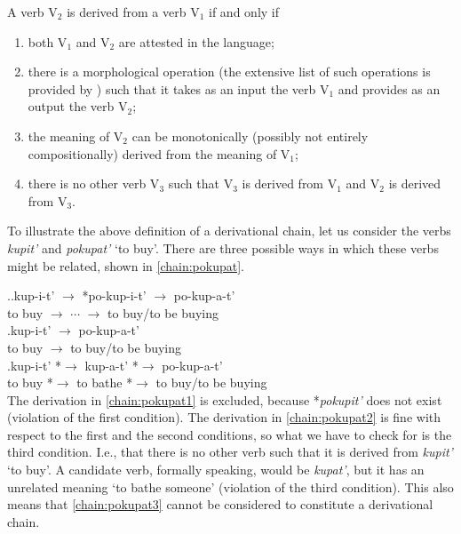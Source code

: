 \begin{definition}\label{def:history}
A verb V$_2$ is derived from a verb V$_1$ if and only if
\begin{enumerate}
\item both V$_1$ and V$_2$ are attested in the language;
\item there is a morphological operation  (the extensive list of such operations is provided by \citealt{Shvedova:82}) such that it takes as an input the verb V$_1$ and provides as an output the verb V$_2$;
\item the meaning of V$_2$ can be monotonically (possibly not entirely compositionally) derived from the meaning of V$_1$;
\item there is no other verb V$_3$ such that V$_3$ is derived from V$_1$ and V$_2$ is derived from V$_3$.
\end{enumerate}
\end{definition}

To illustrate the above definition of a derivational chain, let us consider the verbs \textit{kupit'\textsuperscript{\PF}} and \textit{pokupat'\textsuperscript{\IPF}} `to buy'. There are three possible ways in which these verbs might be related, shown in \ref{chain:pokupat}.

\ex.\label{chain:pokupat}\ag.\label{chain:pokupat1}kup-i-t'\textsuperscript{\PF} $\rightarrow$ *po-kup-i-t' $\rightarrow$ po-kup-a-t'\textsuperscript{\IPF}\\	
{to buy} $\rightarrow$ $\cdots$ $\rightarrow$ {to buy/to be buying}\\
\bg.\label{chain:pokupat2}kup-i-t'\textsuperscript{\PF} $\rightarrow$ po-kup-a-t'\textsuperscript{\IPF}\\
{to buy} $\rightarrow$ {to buy/to be buying}\\
\bg.\label{chain:pokupat3}kup-i-t'\textsuperscript{\PF} *$\rightarrow$ kup-a-t'\textsuperscript{\IPF} *$\rightarrow$ po-kup-a-t'\textsuperscript{\IPF}\\
{to buy} *$\rightarrow$ {to bathe} *$\rightarrow$ {to buy/to be buying}\\

The derivation in \ref{chain:pokupat1} is excluded, because *\textit{pokupit'} does not exist (violation of the first condition). The derivation in \ref{chain:pokupat2} is fine with respect to the first and the second conditions, so what we have to check for is the third condition. I.e., that there is no other verb such that it is derived from \textit{kupit'}\textsuperscript{\PF} `to buy'.  A candidate verb, formally speaking, would be \textit{kupat'\textsuperscript{\IPF}}, but it has an unrelated meaning `to bathe someone' (violation of the third condition). This also means that \ref{chain:pokupat3} cannot be considered to constitute a derivational chain.  

